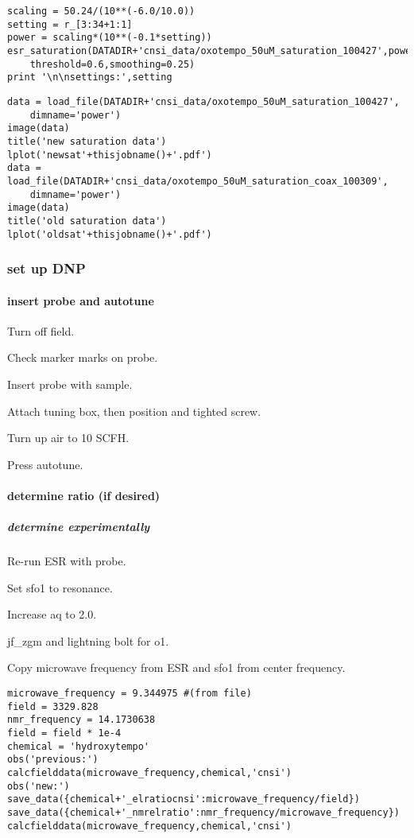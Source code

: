 \begin{tiny}
\begin{lstlisting}
scaling = 50.24/(10**(-6.0/10.0))
setting = r_[3:34+1:1]
power = scaling*(10**(-0.1*setting))
esr_saturation(DATADIR+'cnsi_data/oxotempo_50uM_saturation_100427',power,
    threshold=0.6,smoothing=0.25)
print '\n\nsettings:',setting
\end{lstlisting}


\begin{lstlisting}
data = load_file(DATADIR+'cnsi_data/oxotempo_50uM_saturation_100427',
    dimname='power')
image(data)
title('new saturation data')
lplot('newsat'+thisjobname()+'.pdf')
data = load_file(DATADIR+'cnsi_data/oxotempo_50uM_saturation_coax_100309',
    dimname='power')
image(data)
title('old saturation data')
lplot('oldsat'+thisjobname()+'.pdf')
\end{lstlisting}
\end{tiny}


\subsubsection{set up DNP}

\paragraph{insert probe and autotune}

Turn off field.

Check marker marks on probe.

Insert probe with sample.

Attach tuning box, then position and tighted screw.

Turn up air to 10 SCFH.

Press autotune.

\paragraph{determine ratio (if desired)}

\subparagraph{determine experimentally}
Re-run ESR with probe.

Set sfo1 to resonance.  

Increase aq to 2.0.  

jf\_zgm and lightning bolt for o1.  

Copy microwave frequency from ESR and sfo1 from center frequency.  

\begin{lstlisting}
microwave_frequency = 9.344975 #(from file)
field = 3329.828
nmr_frequency = 14.1730638
field = field * 1e-4
chemical = 'hydroxytempo'
obs('previous:')
calcfielddata(microwave_frequency,chemical,'cnsi')
obs('new:')
save_data({chemical+'_elratiocnsi':microwave_frequency/field})
save_data({chemical+'_nmrelratio':nmr_frequency/microwave_frequency})
calcfielddata(microwave_frequency,chemical,'cnsi')
\end{lstlisting}

